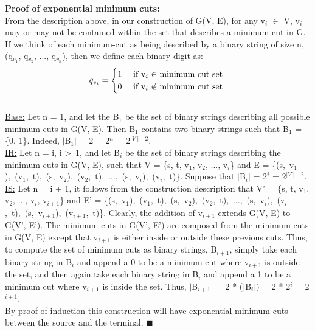 \documentclass[10pt]{csc_assignment}
\begin{document}
\begin{description}
\textbf{Proof of exponential minimum cuts:}\\
From the description above, in our construction of G(V, E), for any v$_{i}$ $\in$ V, v$_{i}$ may or may not be contained within the set that describes a minimum cut in G. If we think of each minimum-cut as being described by a binary string of size n, (q$_{v_{1}}$, q$_{v_{2}}$, ..., q$_{v_{n}}$), then we define each binary digit as:
\[
 q_{v_{i}} = 
\begin{cases} 
      \hfill 1 \hfill & \text{ if v$_{i}$ $\in$ minimum cut set }\\
      \hfill 0 \hfill & \text{ if v$_{i}$ $\notin$ minimum cut set} \\
  \end{cases}
\]\\
\underline{Base:} Let n = 1, and let the B$_{1}$ be the set of binary strings describing all possible minimum cuts in G(V, E). Then B$_{1}$ contains two binary strings such that B$_{1}$ = \{0, 1\}.
Indeed, $\mid$B$_{1}$$\mid$ = 2 = 2$^{n}$ = 2$^{\mid V \mid - 2}$.\\
\underline{IH:} Let n = i, i \textgreater ~1, and let B$_{i}$ be the set of binary strings describing the minimum cuts in G(V, E), such that V = 
\{s, t, v$_{1}$, v$_{2}$, ..., v$_{i}$\} and E = \mbox{\{(s, v$_{1}$), (v$_{1}$, t), (s, v$_{2}$), (v$_{2}$, t), ..., (s, v$_{i}$), (v$_{i}$, t)\}}. Suppose that $\mid$B$_{i}$$\mid$ = 2$^{i}$ = 2$^{\mid V \mid - 2}$.
\\
\underline{IS:} Let n = i + 1, it follows from the construction description that V' = 
\{s, t, v$_{1}$, v$_{2}$, ..., v$_{i}$, v$_{i + 1}$\} and E' = \mbox{\{(s, v$_{1}$), (v$_{1}$, t), (s, v$_{2}$), (v$_{2}$, t), ..., (s, v$_{i}$), (v$_{i}$, t), (s, v$_{i + 1}$), (v$_{i + 1}$, t)\}}. Clearly, the addition of v$_{i + 1}$ extends G(V, E) to G(V', E'). The minimum cuts in G(V', E') are composed from the minimum cuts in G(V, E) except that v$_{i + 1}$ is either inside or outside these previous cuts. Thus, to compute the set of minimum cuts as binary strings, B$_{i + 1}$, simply take each binary string in B$_{i}$ and append a 0 to be a minimum cut where v$_{i + 1}$ is outside the set, and then again take each binary string in B$_{i}$ and append a 1 to be a minimum cut where v$_{i + 1}$ is inside the set. Thus, $\mid$B$_{i + 1}$$\mid$ = 2 * ($\mid$B$_{i}$$\mid$) = 2 * 2$^{i}$ = 2$^{i + 1}$.
\\
By proof of induction this construction will have exponential minimum cuts between the source and the terminal. $\blacksquare$
\\


\end{description}
\end{document}
